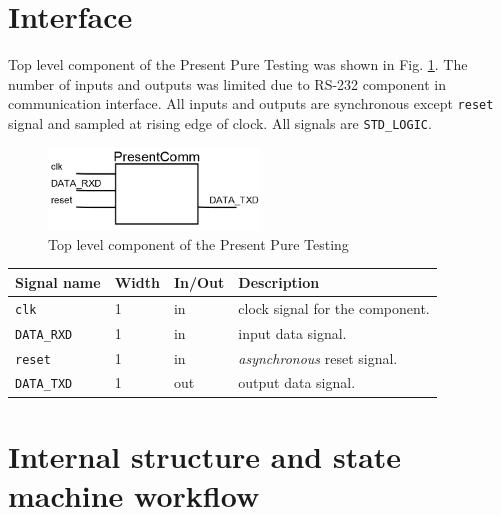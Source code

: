 \documentclass{gajewski}
\begin{document}
\newpage 

\section{Interface}

Top level component of the Present Pure Testing was shown in Fig. \ref{ptest}. The number of inputs and outputs was limited due to RS-232 component in communication interface. All inputs and outputs are synchronous except \texttt{reset} signal and sampled at rising edge of clock. All signals are \texttt{STD\_LOGIC}.
\begin{figure}[!ht]%
    \begin{center}
    \includegraphics[width=0.5\textwidth]{img/PresentPureTesting.png}
    \caption{%
        Top level component of the Present Pure Testing 
     }%
    \label{ptest}
    \end{center}
 \end{figure}

\begin{tabularx}{\textwidth}{|p{30mm}|p{11mm}|p{11mm}|X|}
  \hline \bf{Signal name} & \bf{Width} & \bf{In/Out} & \bf{Description}\\ 
  \hline \texttt{clk} & 1  &  in  & clock signal for the component. \\ 
  \hline \texttt{DATA\_RXD} & 1 & in & input data signal. \\
  \hline \texttt{reset}	& 1  &  in  &  \emph{asynchronous} reset signal.\\ 
  \hline \texttt{DATA\_TXD} & 1 &  out  & output data signal.	\\ 
  \hline
\end{tabularx}

\newpage

\section{Internal structure and state machine workflow}
\end{document}
